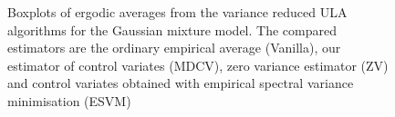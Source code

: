 \documentclass[bj]{imsart}
\begin{document}
 \begin{figure}[tbh]
\centering
{}
\qquad
{}
\caption{Boxplots of ergodic averages  from the variance reduced ULA algorithms for the Gaussian mixture model. The compared estimators are the ordinary empirical average  (Vanilla), our estimator of control variates (MDCV), zero variance estimator (ZV) and control variates obtained with empirical spectral variance minimisation (ESVM)
\label{fig:GMM}}
\end{figure}


\end{document}

